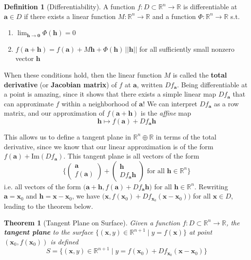 \documentclass{article}
\newtheorem{theorem}{Theorem}[section]
\theoremstyle{remark}
\theoremstyle{definition}
\newtheorem{definition}{Definition}[section]
\begin{document}
\begin{definition}[Differentiability]
A function $f: D \subset \mathbb{R}^n \longrightarrow \mathbb{R}$ is differentiable at $\mathbf{a} \in D$ if there exists a linear function $M: \mathbb{R}^n \longrightarrow \mathbb{R}$ and a function $\Phi: \mathbb{R}^n \longrightarrow \mathbb{R}$ s.t. 
\begin{enumerate}
    \item $\lim_{\mathbf{h} \rightarrow \mathbf{0}} \Phi (\mathbf{h}) = 0$ 
    \item $f( \mathbf{a} + \mathbf{h}) = f(\mathbf{a}) + M \mathbf{h} + \Phi(\mathbf{h}) \, ||\mathbf{h}||$ for all sufficiently small nonzero vector $\mathbf{h}$
\end{enumerate}
When these conditions hold, then the linear function $M$ is called the \textbf{total derivative} (or \textbf{Jacobian matrix}) of $f$ at $\mathbf{a}$, written $D f_\mathbf{a}$. Being differentiable at a point is amazing, since it shows that there exists a simple linear map $D f_\mathbf{a}$ that can approximate $f$ within a neighborhood of $\mathbf{a}$! We can interpret $D f_\mathbf{a}$ as a row matrix, and our approximation of $f(\mathbf{a} + \mathbf{h})$ is the \textit{affine} map 
\[\mathbf{h} \mapsto f(\mathbf{a}) + D f_\mathbf{a} \mathbf{h}\]
\end{definition}

This allows us to define a tangent plane in $\mathbb{R}^n \oplus \mathbb{R}$ in terms of the total derivative, since we know that our linear approximation is of the form $f(\mathbf{a}) + \mathrm{Im}(D f_\mathbf{a})$. This tangent plane is all vectors of the form 
\[\bigg\{ \begin{pmatrix} \mathbf{a} \\ f(\mathbf{a}) \end{pmatrix} + \begin{pmatrix} \mathbf{h} \\ D f_\mathbf{a} \mathbf{h} \end{pmatrix} \text{ for all } \mathbf{h} \in \mathbb{R}^n \bigg\}\]
i.e. all vectors of the form $\big( \mathbf{a} + \mathbf{h}, f(\mathbf{a}) + D f_\mathbf{a} \mathbf{h} \big)$ for all $\mathbf{h} \in \mathbb{R}^n$. Rewriting $\mathbf{a} = \mathbf{x}_0$ and $\mathbf{h} = \mathbf{x} - \mathbf{x}_0$, we have $\big( \mathbf{x}, f(\mathbf{x}_0) + D f_{\mathbf{x}_0} (\mathbf{x} - \mathbf{x}_0) \big)$ for all $\mathbf{x} \in D$, leading to the theorem below. 

\begin{theorem}[Tangent Plane on Surface]
Given a function $f: D \subset \mathbb{R}^n \longrightarrow \mathbb{R}$, the \textbf{tangent plane} to the surface $\{(\mathbf{x}, y) \in \mathbb{R}^{n+1} \mid y = f(\mathbf{x})\}$ at point $(\mathbf{x}_0, f(\mathbf{x}_0))$ is defined 
\[S = \{(\mathbf{x}, y) \in \mathbb{R}^{n+1} \mid y = f (\mathbf{x}_0) + D f_{\mathbf{x}_0} (\mathbf{x} - \mathbf{x}_0)\}\]
\end{theorem}
\end{document}
